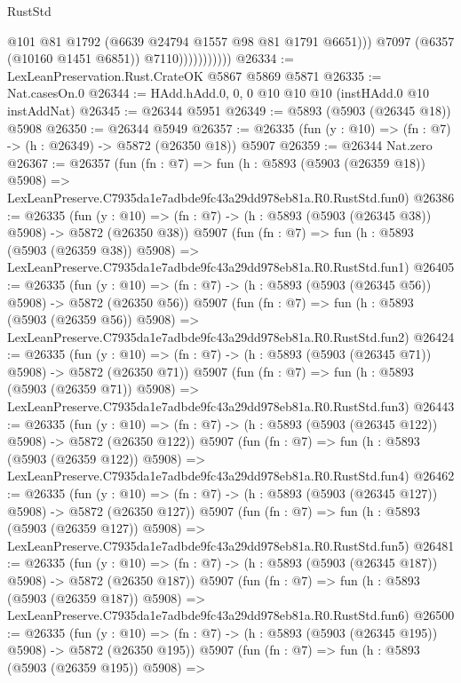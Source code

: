 \begin{lexlean}{RustStd}
\begin{coremodule}
                              @101
                              @81
                              @1792
                              (@6639 @24794 @1557 @98 @81 @1791 @6651)))
                          @7097
                          (@6357 (@10160 @1451 @6851))
                          @7110)))))))))))
@26334 := LexLeanPreservation.Rust.CrateOK @5867 @5869 @5871
@26335 := Nat.casesOn.{0}
@26344 := HAdd.hAdd.{0, 0, 0} @10 @10 @10 (instHAdd.{0} @10 instAddNat)
@26345 := @26344 @5951
@26349 := @5893 (@5903 (@26345 @18)) @5908
@26350 := @26344 @5949
@26357 := @26335 (fun (y : @10) => (fn : @7) -> (h : @26349) -> @5872 (@26350 @18)) @5907
@26359 := @26344 Nat.zero
@26367 := @26357
    (fun (fn : @7) =>
    fun (h : @5893 (@5903 (@26359 @18)) @5908) =>
    LexLeanPreserve.C7935da1e7adbde9fc43a29dd978eb81a.R0.RustStd.fun0)
@26386 := @26335
    (fun (y : @10) => (fn : @7) -> (h : @5893 (@5903 (@26345 @38)) @5908) -> @5872 (@26350 @38))
    @5907
    (fun (fn : @7) =>
    fun (h : @5893 (@5903 (@26359 @38)) @5908) =>
    LexLeanPreserve.C7935da1e7adbde9fc43a29dd978eb81a.R0.RustStd.fun1)
@26405 := @26335
    (fun (y : @10) => (fn : @7) -> (h : @5893 (@5903 (@26345 @56)) @5908) -> @5872 (@26350 @56))
    @5907
    (fun (fn : @7) =>
    fun (h : @5893 (@5903 (@26359 @56)) @5908) =>
    LexLeanPreserve.C7935da1e7adbde9fc43a29dd978eb81a.R0.RustStd.fun2)
@26424 := @26335
    (fun (y : @10) => (fn : @7) -> (h : @5893 (@5903 (@26345 @71)) @5908) -> @5872 (@26350 @71))
    @5907
    (fun (fn : @7) =>
    fun (h : @5893 (@5903 (@26359 @71)) @5908) =>
    LexLeanPreserve.C7935da1e7adbde9fc43a29dd978eb81a.R0.RustStd.fun3)
@26443 := @26335
    (fun (y : @10) => (fn : @7) -> (h : @5893 (@5903 (@26345 @122)) @5908) -> @5872 (@26350 @122))
    @5907
    (fun (fn : @7) =>
    fun (h : @5893 (@5903 (@26359 @122)) @5908) =>
    LexLeanPreserve.C7935da1e7adbde9fc43a29dd978eb81a.R0.RustStd.fun4)
@26462 := @26335
    (fun (y : @10) => (fn : @7) -> (h : @5893 (@5903 (@26345 @127)) @5908) -> @5872 (@26350 @127))
    @5907
    (fun (fn : @7) =>
    fun (h : @5893 (@5903 (@26359 @127)) @5908) =>
    LexLeanPreserve.C7935da1e7adbde9fc43a29dd978eb81a.R0.RustStd.fun5)
@26481 := @26335
    (fun (y : @10) => (fn : @7) -> (h : @5893 (@5903 (@26345 @187)) @5908) -> @5872 (@26350 @187))
    @5907
    (fun (fn : @7) =>
    fun (h : @5893 (@5903 (@26359 @187)) @5908) =>
    LexLeanPreserve.C7935da1e7adbde9fc43a29dd978eb81a.R0.RustStd.fun6)
@26500 := @26335
    (fun (y : @10) => (fn : @7) -> (h : @5893 (@5903 (@26345 @195)) @5908) -> @5872 (@26350 @195))
    @5907
    (fun (fn : @7) =>
    fun (h : @5893 (@5903 (@26359 @195)) @5908) =>

\end{coremodule}
\end{lexlean}
